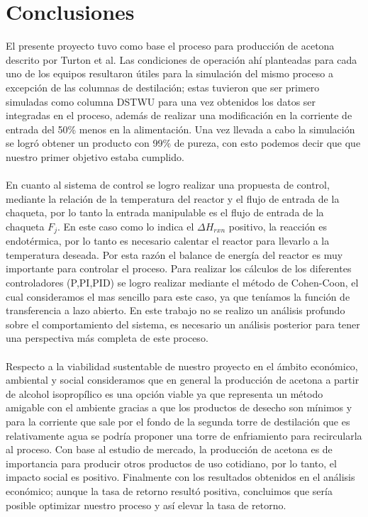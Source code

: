 \section*{Conclusiones}
El presente proyecto tuvo como base el proceso para producción de acetona descrito 
por %
Turton et al. Las condiciones de operación ahí planteadas para cada uno de los
equipos resultaron útiles para la simulación del mismo proceso a excepción de 
las columnas de destilación; estas tuvieron que ser primero simuladas como columna
DSTWU para una vez obtenidos los datos ser integradas en el proceso, además de 
realizar una modificación en la corriente de entrada del 50\% menos en la 
alimentación. Una vez llevada a cabo la simulación se logró obtener un producto con 
99\% de pureza, con esto  podemos decir que que nuestro primer objetivo estaba 
cumplido.
\paragraph{}
En cuanto al sistema de control se logro realizar una propuesta de control, 
mediante la relación de la temperatura del reactor y el flujo de entrada de  la 
chaqueta, por lo tanto la entrada manipulable es el flujo de entrada de la 
chaqueta $F_j$. En este caso como lo indica el $\Delta H_{rxn} $ positivo, la 
reacción es endotérmica, por lo tanto es necesario calentar el reactor para 
llevarlo a la temperatura deseada. Por esta razón el balance de energía del 
reactor es muy importante para controlar el proceso.
Para realizar los cálculos de los diferentes controladores (P,PI,PID) se logro 
realizar mediante el método de Cohen-Coon, el cual consideramos el mas sencillo 
para este caso, ya que teníamos la función de transferencia a lazo abierto.
 En este trabajo no se realizo un  análisis profundo sobre el  comportamiento 
 del sistema, es necesario un análisis posterior para tener una perspectiva más 
 completa de este proceso.
\paragraph{}
Respecto a la viabilidad sustentable de nuestro proyecto en el ámbito económico, 
ambiental y social consideramos que en general la producción de acetona a partir 
de alcohol isopropílico es una opción viable ya que representa un método amigable 
con el ambiente gracias a que los productos de desecho son mínimos y para la 
corriente que sale por el fondo de la segunda torre de destilación que es 
relativamente agua se podría proponer una torre de enfriamiento para 
recircularla al proceso. Con base al estudio de mercado, la producción 
de acetona es de importancia para producir otros productos de uso 
cotidiano, por lo tanto, el impacto social es positivo. Finalmente 
con los resultados obtenidos en el análisis económico; aunque la 
tasa de retorno resultó positiva, concluimos que sería posible optimizar 
nuestro proceso y así elevar la tasa de retorno.
